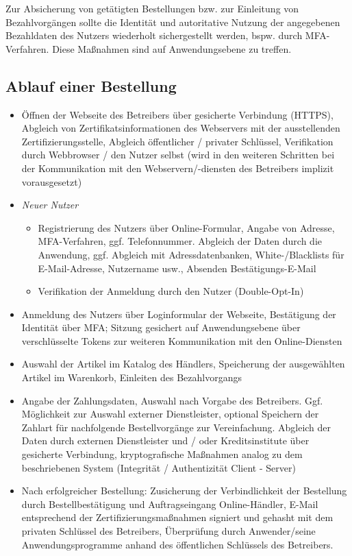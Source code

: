 \noindent
Zur Absicherung von getätigten Bestellungen bzw. zur Einleitung von Bezahlvorgängen sollte die Identität und autoritative Nutzung der angegebenen Bezahldaten des Nutzers wiederholt sichergestellt werden, bspw. durch MFA-Verfahren.
Diese Maßnahmen sind auf Anwendungsebene zu treffen.

\subsection{Ablauf einer Bestellung}

\begin{itemize}
    \itemsep0.5em
    \item Öffnen der Webseite des Betreibers über gesicherte Verbindung (HTTPS), Abgleich von Zertifikatsinformationen des Webservers mit der ausstellenden Zertifizierungsstelle, Abgleich öffentlicher / privater Schlüssel, Verifikation durch Webbrowser / den Nutzer selbst (wird in den weiteren Schritten bei der Kommunikation mit den Webservern/-diensten des Betreibers implizit vorausgesetzt)
    \item \textit{Neuer Nutzer}
    \begin{itemize}
        \item Registrierung des Nutzers über Online-Formular, Angabe von Adresse, MFA-Verfahren, ggf. Telefonnummer. Abgleich der Daten durch die Anwendung, ggf. Abgleich mit Adressdatenbanken, White-/Blacklists für E-Mail-Adresse, Nutzername usw., Absenden Bestätigungs-E-Mail
        \item Verifikation der Anmeldung durch den Nutzer (Double-Opt-In)
    \end{itemize}
    \item Anmeldung des Nutzers über Loginformular der Webseite, Bestätigung der Identität über MFA; Sitzung gesichert auf Anwendungsebene über verschlüsselte Tokens zur weiteren Kommunikation mit den Online-Diensten
    \item Auswahl der Artikel im Katalog des Händlers, Speicherung der ausgewählten Artikel im Warenkorb, Einleiten des Bezahlvorgangs
    \item Angabe der Zahlungsdaten, Auswahl nach Vorgabe des Betreibers. Ggf. Möglichkeit zur Auswahl externer Dienstleister, optional Speichern der Zahlart für nachfolgende Bestellvorgänge zur Vereinfachung. Abgleich der Daten durch externen Dienstleister und / oder Kreditsinstitute über gesicherte Verbindung, kryptografische Maßnahmen analog zu dem beschriebenen System (Integrität / Authentizität Client - Server)
    \item Nach erfolgreicher Bestellung: Zusicherung der Verbindlichkeit der Bestellung durch Bestellbestätigung und Auftragseingang Online-Händler, E-Mail entsprechend der Zertifizierungsmaßnahmen signiert und gehasht mit dem privaten Schlüssel des Betreibers, Überprüfung durch Anwender/seine Anwendungsprogramme anhand des öffentlichen Schlüssels des Betreibers.
\end{itemize}